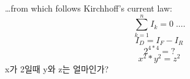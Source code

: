 \documentclass{article}
\begin{document}
\ldots from which follows Kirchhoff’s current law:
\begin{equation}
\sum_{k=1}^{n} I_k = 0 \; . \ldots
\end{equation}
\begin{equation}
I_D = I_F - I_R
\end{equation}
\begin{equation}
2^{4*4} = ?
\end{equation}
\begin{equation}
x^2 * y^2 = z^2
\end{equation}
x가 2일때 y와 z는 얼마인가?
\end{document}

